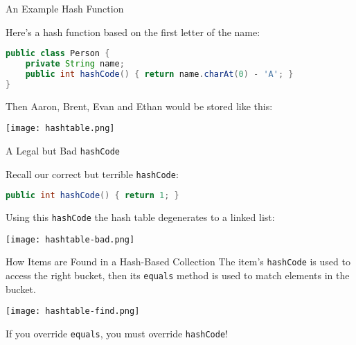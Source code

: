 \documentclass{beamer}
\begin{document}
\begin{frame}[fragile]{An Example Hash Function}

Here's a hash function based on the first letter of the name:
\begin{lstlisting}[language=Java]
public class Person {
    private String name;
    public int hashCode() { return name.charAt(0) - 'A'; }
}
\end{lstlisting}

Then Aaron, Brent, Evan and Ethan would be stored like this:
\begin{center}
\texttt{[image: hashtable.png]}
\end{center}

\end{frame}

\begin{frame}[fragile]{A Legal but Bad {\tt hashCode}}

Recall our correct but terrible {\tt hashCode}:
\begin{lstlisting}[language=Java]
public int hashCode() { return 1; }
\end{lstlisting}

Using this {\tt hashCode} the hash table degenerates to a linked list:

\begin{center}
\texttt{[image: hashtable-bad.png]}
\end{center}

\end{frame}

\begin{frame}[fragile]{How Items are Found in a Hash-Based Collection}
\vspace{-.1in}
The item's {\tt hashCode} is used to access the right bucket, then its {\tt equals} method is used to match elements in the bucket.
\vspace{-.1in}
\begin{center}
\texttt{[image: hashtable-find.png]}
\end{center}
\vspace{-.1in}
If you override {\tt equals}, you must override {\tt hashCode}!
\end{frame}
\end{document}
